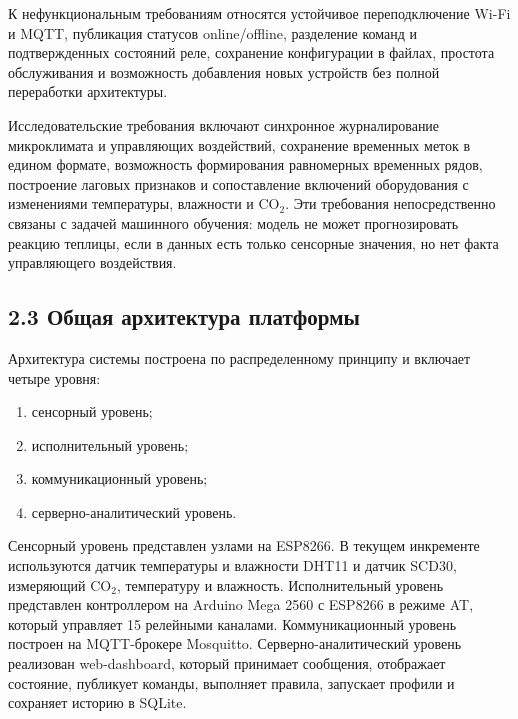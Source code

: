 \documentclass[a4paper,14pt]{extarticle}
\providecommand{\tightlist}{%
  \setlength{\itemsep}{0pt}\setlength{\parskip}{0pt}}
\begin{document}
К нефункциональным требованиям относятся устойчивое переподключение
Wi-Fi и MQTT, публикация статусов online/offline, разделение команд и
подтвержденных состояний реле, сохранение конфигурации в файлах,
простота обслуживания и возможность добавления новых устройств без
полной переработки архитектуры.

Исследовательские требования включают синхронное журналирование
микроклимата и управляющих воздействий, сохранение временных меток в
едином формате, возможность формирования равномерных временных рядов,
построение лаговых признаков и сопоставление включений оборудования с
изменениями температуры, влажности и CO\(_2\). Эти требования
непосредственно связаны с задачей машинного обучения: модель не может
прогнозировать реакцию теплицы, если в данных есть только сенсорные
значения, но нет факта управляющего воздействия.

\hypertarget{ux43eux431ux449ux430ux44f-ux430ux440ux445ux438ux442ux435ux43aux442ux443ux440ux430-ux43fux43bux430ux442ux444ux43eux440ux43cux44b}{%
\subsection{2.3 Общая архитектура
платформы}\label{ux43eux431ux449ux430ux44f-ux430ux440ux445ux438ux442ux435ux43aux442ux443ux440ux430-ux43fux43bux430ux442ux444ux43eux440ux43cux44b}}

Архитектура системы построена по распределенному принципу и включает
четыре уровня:

\begin{enumerate}
\def\labelenumi{\arabic{enumi})}
\tightlist
\item
  сенсорный уровень;
\item
  исполнительный уровень;
\item
  коммуникационный уровень;
\item
  серверно-аналитический уровень.
\end{enumerate}

Сенсорный уровень представлен узлами на ESP8266. В текущем инкременте
используются датчик температуры и влажности DHT11 и датчик SCD30,
измеряющий CO\(_2\), температуру и влажность. Исполнительный уровень
представлен контроллером на Arduino Mega 2560 с ESP8266 в режиме AT,
который управляет 15 релейными каналами. Коммуникационный уровень
построен на MQTT-брокере Mosquitto. Серверно-аналитический уровень
реализован web-dashboard, который принимает сообщения, отображает
состояние, публикует команды, выполняет правила, запускает профили и
сохраняет историю в SQLite.
\end{document}
